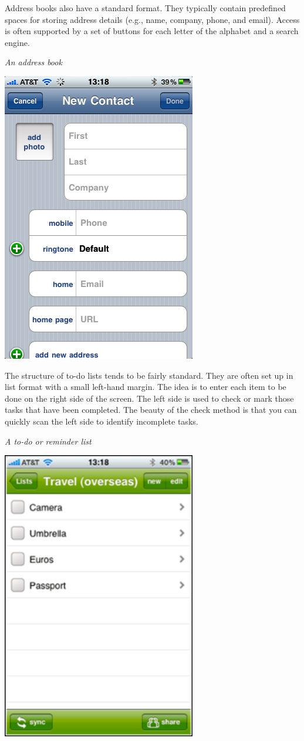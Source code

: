 \documentclass[
]{article}
\begin{document}
Address books also have a standard format. They typically contain
predefined spaces for storing address details (e.g., name, company,
phone, and email). Access is often supported by a set of buttons for
each letter of the alphabet and a search engine.

\emph{An address book}

\includegraphics{Figures/Chapter 1/address book.png}

The structure of to-do lists tends to be fairly standard. They are often
set up in list format with a small left-hand margin. The idea is to
enter each item to be done on the right side of the screen. The left
side is used to check or mark those tasks that have been completed. The
beauty of the check method is that you can quickly scan the left side to
identify incomplete tasks.

\emph{A to-do or reminder list}

\includegraphics[width=3.33333in,height=\textheight]{Figures/Chapter 1/todo list new.png}
\end{document}
